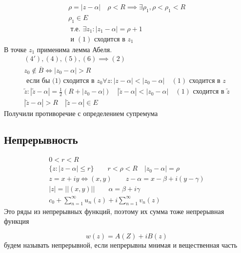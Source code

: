 \documentclass[main]{subfiles}
\begin{document}
\begin{longProof}
    \begin{gather*}
        \rho = |z-\alpha| \quad \rho < R \implies \exists \rho_1, \rho < \rho_1 < R \tag{4\prime}\\
        \rho_1 \in E \tag{4} \\
        \text{ т.е. } \exists z_1 : |z_1-\alpha| = \rho+1 \tag{5} \\
        \text{ и } (1) \text{ сходится в } z_1 \tag{6} 
    \end{gather*} 
    В точке $z_1$ применима лемма Абеля.
    \begin{gather*}
        (4\prime), (4), (5),(6) \implies (2) \\
        z_0 \notin \overline{B} \Leftrightarrow |z_0 - \alpha| > R \\
        \text{ если бы (1) сходится в } z_0
        \forall z : |z-\alpha| < |z_0 - \alpha| \quad (1) \text{ сходится в } z \\
        \tilde{z} : |\tilde{z} - \alpha| = \frac{1}{2} (R + |z_0 - \alpha|) \quad |\tilde{z} - \alpha| < |z_0 - \alpha| \quad (1) \text{ сходится в } \tilde{z} \\
        |\tilde{z} - \alpha| > R \quad |\tilde{z} - \alpha | \in E
    \end{gather*}
    Получили противоречие с определением супремума
\end{longProof}

\subsection*{Непрерывность}
\begin{theorem}
    \begin{gather*}
        0 < r < R \\
        \{ z: |z-\alpha| \leq r \} \quad  \quad r < \rho < R \quad |z_0 - \alpha| = \rho \\
        z = x + iy \Leftrightarrow (x,y)  \quad \quad z - \alpha = x - \beta + i(y - \gamma)\\
        |z| = ||(x,y)|| \quad \quad \alpha = \beta + i\gamma \\
        c_0 + \sum^\infty_{n=1} u_n(z) + i \sum^\infty_{n=1} v_n(z)
    \end{gather*}
    Это ряды из непрерывных функций, поэтому их сумма тоже непрерывная функция
\end{theorem}

\begin{definition}[Непрерывность]
    \[w(z) = A(Z) + iB(z) \] будем называть непрерывной, если непрерывны мнимая и вещественная часть
\end{definition}
\end{document}
